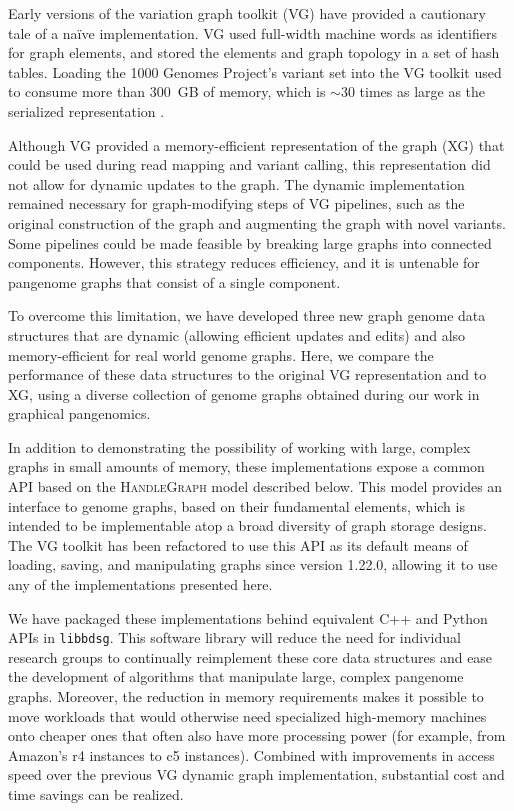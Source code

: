 \documentclass[11pt]{ucthesis}
\begin{document}
Early versions of the variation graph toolkit (\textsc{VG}) \cite{garrison2018variation} have provided a cautionary tale of a na\"ive implementation.
\textsc{VG} used full-width machine words as identifiers for graph elements, and stored the elements and graph topology in a set of hash tables.
Loading the 1000 Genomes Project's variant set into the \textsc{VG} toolkit used to consume more than 300~GB of memory, which is $\sim$30 times as large as the serialized representation \cite{Garrison_2019}.

Although \textsc{VG} provided a memory-efficient representation of the graph (\textsc{XG}) that could be used during read mapping and variant calling, this representation did not allow for dynamic updates to the graph.
The dynamic implementation remained necessary for graph-modifying steps of \textsc{VG} pipelines, such as the original construction of the graph and augmenting the graph with novel variants.
Some pipelines could be made feasible by breaking large graphs into connected components.
However, this strategy reduces efficiency, and it is untenable for pangenome graphs that consist of a single component.

To overcome this limitation, we have developed three new graph genome data structures that are dynamic (allowing efficient updates and edits) and also memory-efficient for real world genome graphs.
Here, we compare the performance of these data structures to the original \textsc{VG} representation and to \textsc{XG}, using a diverse collection of genome graphs obtained during our work in graphical pangenomics.

In addition to demonstrating the possibility of working with large, complex graphs in small amounts of memory, these implementations expose a common API based on the \textsc{HandleGraph} model described below.
This model provides an interface to genome graphs, based on their fundamental elements, which is intended to be implementable atop a broad diversity of graph storage designs.
The \textsc{VG} toolkit has been refactored to use this API as its default means of loading, saving, and manipulating graphs since version 1.22.0, allowing it to use any of the implementations presented here. 

We have packaged these implementations behind equivalent C++ and Python APIs in \texttt{libbdsg}.
This software library will reduce the need for individual research groups to continually reimplement these core data structures and ease the development of algorithms that manipulate large, complex pangenome graphs.
Moreover, the reduction in memory requirements makes it possible to move workloads that would otherwise need specialized high-memory machines onto cheaper ones that often also have more processing power (for example, from Amazon's r4 instances to c5 instances).
Combined with improvements in access speed over the previous \textsc{VG} dynamic graph implementation, substantial cost and time savings can be realized.
\end{document}
